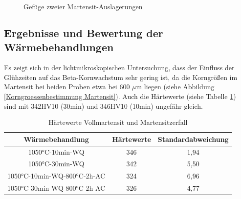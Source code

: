 \documentclass[a4paper, 11pt]{tubsreprt}
\begin{document}
\begin{figure}
\caption{Gefüge zweier Martensit-Auslagerungen}
\label{Gefuegestruktur zweier Martensit Auslageungen}
\end{figure}

\newpage


\subsection{Ergebnisse und Bewertung der Wärmebehandlungen}
Es zeigt sich in der lichtmikroskopischen Untersuchung, dass der Einfluss der Glühzeiten auf das Beta-Kornwachstum sehr gering ist, da die Korngrößen im Martensit bei beiden Proben etwa bei 600 $\mu$m liegen (siehe Abbildung \ref{Korngroessenbestimmung Martensit}). Auch die Härtewerte (siehe Tabelle \ref{Härtewerte Vollmartensit und Martensitzerfall}) sind mit 342HV10 (30min) und 346HV10 (10min) ungefähr gleich. 
\begin{table}
\begin{tabular}{c|c|c}
Wärmebehandlung & Härtewerte & Standardabweichung\\
\hline
1050°C-10min-WQ & 346 & 1,94 \\
\hline
1050°C-30min-WQ & 342 & 5,50 \\
\hline
1050°C-10min-WQ-800°C-2h-AC & 324 & 6,96 \\
\hline
1050°C-30min-WQ-800°C-2h-AC & 326 & 4,77 \\
\end{tabular}
\caption{Härtewerte Vollmartensit und Martensitzerfall}
\label{Härtewerte Vollmartensit und Martensitzerfall}

\end{table}
\end{document}
